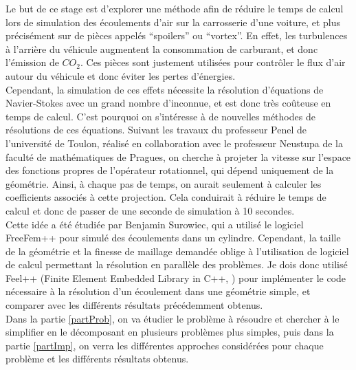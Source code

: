 Le but de ce stage est d'explorer une méthode afin de réduire le temps de calcul lors de simulation des écoulements d'air sur la carrosserie d'une voiture, et plus précisément sur de pièces appelés ``spoilers'' ou ``vortex''. En effet, les turbulences à l'arrière du véhicule augmentent la consommation de carburant, et donc l'émission de $CO_2$. Ces pièces sont justement utilisées pour contrôler le flux d'air autour du véhicule et donc éviter les pertes d'énergies.\\

Cependant, la simulation de ces effets nécessite la résolution d'équations de Navier-Stokes avec un grand nombre d'inconnue, et est donc très coûteuse en temps de calcul. C'est pourquoi on s'intéresse à de nouvelles méthodes de résolutions de ces équations. Suivant les travaux \cite{Penel2004} du professeur Penel de l'université de Toulon, réalisé en collaboration avec le professeur Neustupa de la faculté de mathématiques de Pragues, on cherche à projeter la vitesse sur l'espace des fonctions propres de l'opérateur rotationnel, qui dépend uniquement de la géométrie. Ainsi, à chaque pas de temps, on aurait seulement à calculer les coefficients associés à cette projection. Cela conduirait à réduire le temps de calcul et donc de passer de une seconde de simulation à 10 secondes.\\

Cette idée a été étudiée par Benjamin Surowiec, qui a utilisé le logiciel FreeFem++ pour simulé des écoulements dans un cylindre. Cependant, la taille de la géométrie et la finesse de maillage demandée oblige à l'utilisation de logiciel de calcul permettant la résolution en parallèle des problèmes. Je dois donc utilisé Feel++ (Finite Element Embedded Library in C++, \cite{PRUDHOMME:2012:HAL-00662868:3,feelpp098:10046} ) pour implémenter le code nécessaire à la résolution d'un écoulement dans une géométrie simple, et comparer avec les différents résultats précédemment obtenus.\\

Dans la partie \ref{partProb}, on va étudier le problème à résoudre et chercher à le simplifier en le décomposant en plusieurs problèmes plus simples, puis dans la partie \ref{partImp}, on verra les différentes approches considérées pour chaque problème et les différents résultats obtenus.

